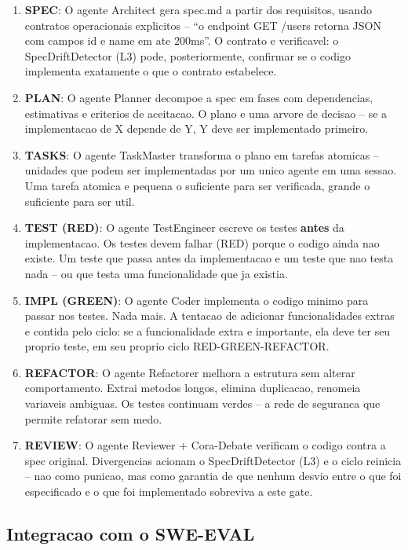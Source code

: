 \documentclass[12pt,a4paper,oneside,sumario=tradicional,chapter=TITLE,section=TITLE,subsection=TITLE,english,brazil]{abntex2}
\begin{document}
\begin{enumerate}[leftmargin=*]
  \item \textbf{SPEC}: O agente Architect gera spec.md a partir dos requisitos, usando contratos operacionais explicitos -- ``o endpoint GET /users retorna JSON com campos id e name em ate 200ms''. O contrato e verificavel: o SpecDriftDetector (L3) pode, posteriormente, confirmar se o codigo implementa exatamente o que o contrato estabelece.
  \item \textbf{PLAN}: O agente Planner decompoe a spec em fases com dependencias, estimativas e criterios de aceitacao. O plano e uma arvore de decisao -- se a implementacao de X depende de Y, Y deve ser implementado primeiro.
  \item \textbf{TASKS}: O agente TaskMaster transforma o plano em tarefas atomicas -- unidades que podem ser implementadas por um unico agente em uma sessao. Uma tarefa atomica e pequena o suficiente para ser verificada, grande o suficiente para ser util.
  \item \textbf{TEST (RED)}: O agente TestEngineer escreve os testes \textbf{antes} da implementacao. Os testes devem falhar (RED) porque o codigo ainda nao existe. Um teste que passa antes da implementacao e um teste que nao testa nada -- ou que testa uma funcionalidade que ja existia.
  \item \textbf{IMPL (GREEN)}: O agente Coder implementa o codigo minimo para passar nos testes. Nada mais. A tentacao de adicionar funcionalidades extras e contida pelo ciclo: se a funcionalidade extra e importante, ela deve ter seu proprio teste, em seu proprio ciclo RED-GREEN-REFACTOR.
  \item \textbf{REFACTOR}: O agente Refactorer melhora a estrutura sem alterar comportamento. Extrai metodos longos, elimina duplicacao, renomeia variaveis ambiguas. Os testes continuam verdes -- a rede de seguranca que permite refatorar sem medo.
  \item \textbf{REVIEW}: O agente Reviewer + Cora-Debate verificam o codigo contra a spec original. Divergencias acionam o SpecDriftDetector (L3) e o ciclo reinicia -- nao como punicao, mas como garantia de que nenhum desvio entre o que foi especificado e o que foi implementado sobreviva a este gate.
\end{enumerate}

\subsection{Integracao com o SWE-EVAL}
\end{document}
